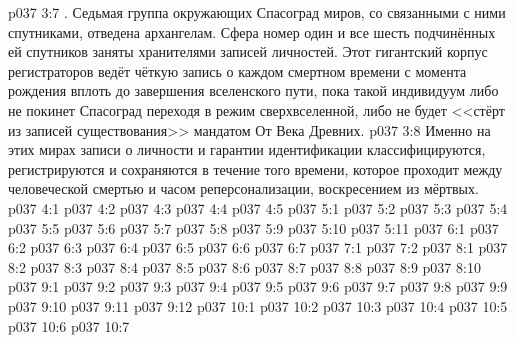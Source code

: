 \vs p037 3:7 \pc {}. Седьмая группа окружающих Спасоград миров, со связанными с ними спутниками, отведена архангелам. Сфера номер один и все шесть подчинённых ей спутников заняты хранителями записей личностей. Этот гигантский корпус регистраторов ведёт чёткую запись о каждом смертном времени с момента рождения вплоть до завершения вселенского пути, пока такой индивидуум либо не покинет Спасоград переходя в режим сверхвселенной, либо не будет <<стёрт из записей существования>> мандатом От Века Древних.
\vs p037 3:8 Именно на этих мирах записи о личности и гарантии идентификации классифицируются, регистрируются и сохраняются в течение того времени, которое проходит между человеческой смертью и часом реперсонализации, воскресением из мёртвых.
\vs p037 4:1 
\vs p037 4:2 
\vs p037 4:3 
\vs p037 4:4 
\vs p037 4:5 
\vs p037 5:1 
\vs p037 5:2 
\vs p037 5:3 
\vs p037 5:4 \pc 
\vs p037 5:5 
\vs p037 5:6 
\vs p037 5:7 
\vs p037 5:8 
\vs p037 5:9 
\vs p037 5:10 \pc 
\vs p037 5:11 
\vs p037 6:1 
\vs p037 6:2 
\vs p037 6:3 \pc 
\vs p037 6:4 
\vs p037 6:5 \pc 
\vs p037 6:6 
\vs p037 6:7 \pc 
{}
\vs p037 7:1 
\vs p037 7:2 
\vs p037 8:1 
\vs p037 8:2 \pc 
\vs p037 8:3 
\vs p037 8:4 
\vs p037 8:5 
\vs p037 8:6 
\vs p037 8:7 
\vs p037 8:8 
\vs p037 8:9 
\vs p037 8:10 \pc 
{}
\vs p037 9:1 
\vs p037 9:2 
\vs p037 9:3 
\vs p037 9:4 
\vs p037 9:5 
\vs p037 9:6 \pc 
\vs p037 9:7 \pc 
\vs p037 9:8 \pc 
\vs p037 9:9 \pc 
\vs p037 9:10 
\vs p037 9:11 \pc 
\vs p037 9:12 \pc 
{}
\vs p037 10:1 
\vs p037 10:2 \pc 
\vs p037 10:3 \pc 
\vs p037 10:4 \pc 
\vs p037 10:5 
\vs p037 10:6 
\vsetoff
\vs p037 10:7 
\quizlink
